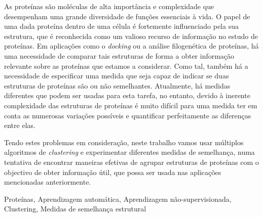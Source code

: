 
As proteínas são moléculas de alta importância e complexidade que desempenham uma grande diversidade de funções essenciais à vida. O papel de uma dada proteína dentro de uma célula é fortemente influenciado pela sua estrutura, que é reconhecida como um valioso recurso de informação no estudo de proteínas. Em aplicações como o \textit{docking} ou a análise filogenética de proteínas, há uma necessidade de comparar tais estruturas de forma a obter informação relevante sobre as proteínas que estamos a considerar. Como tal, também há a necessidade de especificar uma medida que seja capaz de indicar se duas estruturas de proteínas são ou não semelhantes. Atualmente, há medidas diferentes que podem ser usadas para esta tarefa, no entanto, devido à inerente complexidade das estruturas de proteínas é muito difícil para uma medida ter em conta as numerosas variações possíveis e quantificar perfeitamente as diferenças entre elas.  

Tendo estes problemas em consideração, neste trabalho vamos usar múltiplos algoritmos de \textit{clustering} e experimentar diferentes medidas de semelhança, numa tentativa de encontrar maneiras efetivas de agrupar estruturas de proteínas com o objectivo de obter informação útil, que possa ser usada nas aplicações mencionadas anteriormente.

\begin{keywords}
Proteínas, Aprendizagem automática, Aprendizagem não-supervisionada, Clustering, Medidas de semelhança estrutural
\end{keywords}
